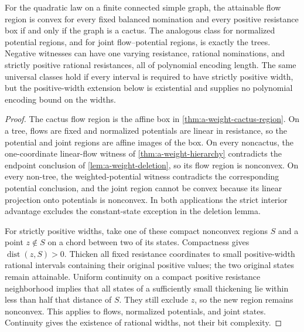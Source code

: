 \begin{theorem}
\label{thm:a-weight-convex-regions}
For the quadratic law on a finite connected simple graph, the attainable
flow region is convex for every fixed balanced nomination and every
positive resistance box if and only if the graph is a cactus.
The analogous class for normalized potential regions, and for joint
flow--potential regions, is exactly the trees. Negative witnesses can
have one varying resistance, rational nominations, and strictly positive
rational resistances, all of polynomial encoding length.
The same universal classes hold if every interval is required to
have strictly positive width, but the positive-width extension below is
existential and supplies no polynomial encoding bound on the widths.
\end{theorem}
\begin{proof}
The cactus flow region is the affine box in
\cref{thm:a-weight-cactus-region}. On a tree, flows are fixed and normalized
potentials are linear in resistance, so the potential and joint regions
are affine images of the box. On every noncactus, the one-coordinate
linear-flow witness of \cref{thm:a-weight-hierarchy} contradicts the
endpoint conclusion of \cref{lem:a-weight-deletion}, so its flow region
is nonconvex. On every non-tree, the weighted-potential witness contradicts
the corresponding potential conclusion, and the joint region cannot be
convex because its linear projection onto potentials is nonconvex.
In both applications the strict interior advantage excludes the
constant-state exception in the deletion lemma.

For strictly positive widths, take one of these compact nonconvex
regions $S$ and a point $z\notin S$ on a chord between two of its states.
Compactness gives $\operatorname{dist}(z,S)>0$.
Thicken all fixed resistance coordinates to small positive-width rational
intervals containing their original positive values; the two original
states remain attainable. Uniform continuity on a compact positive
resistance neighborhood implies that all states of a sufficiently small
thickening lie within less than half that distance of $S$.
They still exclude $z$, so the new region remains nonconvex. This applies
to flows, normalized potentials, and joint states. Continuity gives the
existence of rational widths, not their bit complexity.
\end{proof}

